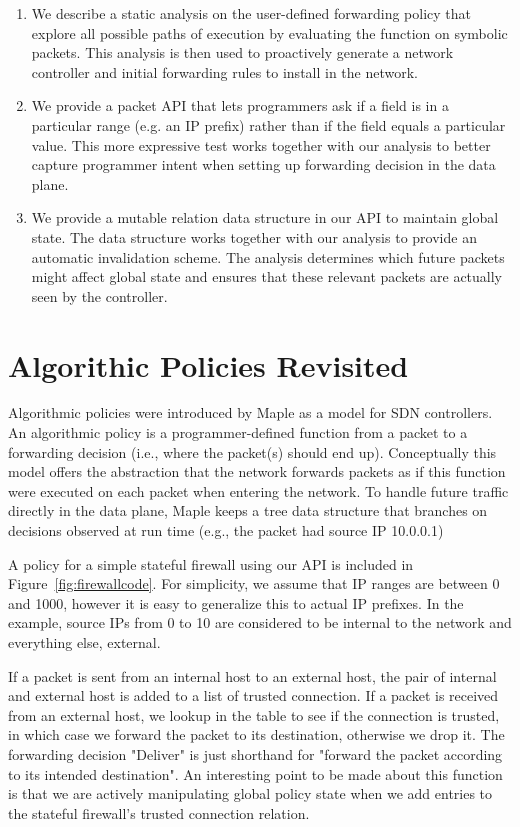 \documentclass[preprint]{sigplanconf}
\begin{document}
\begin{enumerate}
\item We describe a static analysis on the user-defined forwarding policy that explore all possible paths of execution by evaluating the function on symbolic packets. This analysis is then used to proactively generate a network controller and initial forwarding rules to install in the network.
\item We provide a packet API that lets programmers ask if a field is in a particular range (e.g. an IP prefix) rather than if the field equals a particular value. This more expressive test works together with our analysis to better capture programmer intent when setting up forwarding decision in the data plane.
\item We provide a mutable relation data structure in our API to maintain global state. The data structure works together with our analysis to provide an automatic invalidation scheme. The analysis determines which future packets might affect global state and ensures that these relevant packets are actually seen by the controller.
\end{enumerate}



\section*{Algorithic Policies Revisited}
Algorithmic policies were introduced by Maple as a model for SDN controllers. An algorithmic policy is a programmer-defined function from a packet to a forwarding decision (i.e., where the packet(s) should end up). Conceptually this model offers the abstraction that the network forwards packets as if this function were executed on each packet when entering the network. To handle future traffic directly in the data plane, Maple keeps a tree data structure that branches on decisions observed at run time (e.g., the packet had source IP 10.0.0.1)


A policy for a simple stateful firewall using our API is included in Figure~\ref{fig:firewallcode}. For simplicity, we assume that IP ranges are between 0 and 1000, however it is easy to generalize this to actual IP prefixes.
In the example, source IPs from 0 to 10 are considered to be internal to the network and everything else, external. 

If a packet is sent from an internal host to an external host, the pair of internal and external host is added to a list of trusted connection. If a packet is received from an external host, we lookup in the table to see if the connection is trusted, in which case we forward the packet to its destination, otherwise we drop it. The forwarding decision "Deliver" is just shorthand for "forward the packet according to its intended destination".
An interesting point to be made about this function is that we are actively manipulating global policy state when we add entries to the stateful firewall's trusted connection relation.
\end{document}
